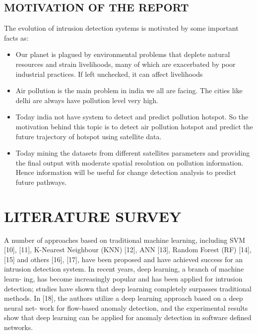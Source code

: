 \documentclass[12pt]{report}	%
\begin{document}
\section{MOTIVATION OF THE REPORT}
The evolution of intrusion detection systems is motivated
by some important facts as:
\begin{itemize}
	\item Our planet is plagued by environmental problems that deplete natural
    resources and strain livelihoods, many of which are exacerbated by poor industrial
    practices. If left unchecked, it can affect livelihoods
	
	\item Air pollution is the main
    problem in india we all are facing. The cities like delhi are always have pollution
    level very high.
    
	\item Today india not have system to detect and predict pollution hotspot.
    So the motivation behind this topic is to detect air pollution hotspot and predict the future trajectory of hotspot using satellite data.

	\item Today mining the datasets from
    different satellites parameters and providing the final output with moderate spatial
    resolution on pollution information. Hence information will be useful for change detection analysis to predict future pathways.
    

\end{itemize}

\chapter{LITERATURE SURVEY}
A number of approaches based on traditional machine learning, including SVM [10], [11],
K-Nearest Neighbour (KNN) [12], ANN [13], Random Forest (RF) [14], [15] and others [16], [17], have been proposed and have achieved success for an intrusion detection
system. In recent years, deep learning, a branch of machine learn-
ing, has become increasingly popular and has been applied
for intrusion detection; studies have shown that deep learning
completely surpasses traditional methods. In [18], the authors
utilize a deep learning approach based on a deep neural net-
work for flow-based anomaly detection, and the experimental
results show that deep learning can be applied for anomaly
detection in software defined networks.
\end{document}
